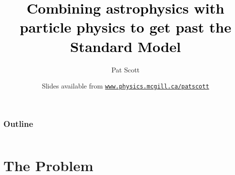 \documentclass[xcolor=dvipsnames]{beamer}
\title[{\color[rgb]{0, 0, 0}Beyond the Standard Model with astro+particle physics}]{\textcolor{black}{Combining astrophysics with particle physics to get past the Standard Model}}
\author[Pat Scott -- April 11 -- RSAA]{Pat Scott}
\institute{\small{Imperial College London}}
\date[April 11, 2014]{Slides available from \color[rgb]{0.1, 0.0, 0.6} \href{http://www.physics.mcgill.ca/~patscott}{\tt www.physics.mcgill.ca/{\urltilda}patscott}}
\begin{document}
\maketitle


\begin{frame}
  \frametitle{Outline}
  \begin{columns}[t]
	\tableofcontents[sections={1}]
        \vspace{3mm}
	\tableofcontents[sections={2}]
        \vspace{3mm}
	\tableofcontents[sections={3}]
  \end{columns}	
\end{frame}

\section{The Problem}
\end{document}
